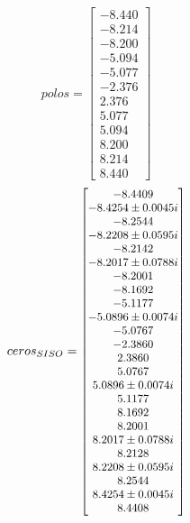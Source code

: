 \begin{equation}\label{eq:polos_stewart}
    polos = \begin{bmatrix}
        -8.440 \\ -8.214 \\ -8.200 \\ -5.094 \\ -5.077 \\ -2.376 \\
        2.376 \\ 5.077 \\ 5.094 \\ 8.200 \\ 8.214 \\ 8.440
    \end{bmatrix} 
\end{equation}
\begin{equation} \label{eq:ceros_stewart}
    ceros_{SISO} = \scalebox{0.9}{$\begin{bmatrix}
       -8.4409                  \\
       -8.4254   \pm 0.0045 i   \\
       -8.2544                  \\
       -8.2208   \pm 0.0595 i   \\
       -8.2142                  \\
       -8.2017   \pm 0.0788 i   \\
       -8.2001                  \\
       -8.1692                  \\
       -5.1177                  \\
       -5.0896   \pm 0.0074 i   \\
       -5.0767                  \\
       -2.3860                  \\
        2.3860                  \\
        5.0767                  \\
        5.0896   \pm 0.0074 i   \\
        5.1177                  \\
        8.1692                  \\
        8.2001                  \\
        8.2017   \pm 0.0788 i   \\
        8.2128                  \\
        8.2208   \pm 0.0595 i   \\
        8.2544                  \\
        8.4254   \pm 0.0045 i   \\
        8.4408                  \\
    \end{bmatrix} $}
\end{equation}

